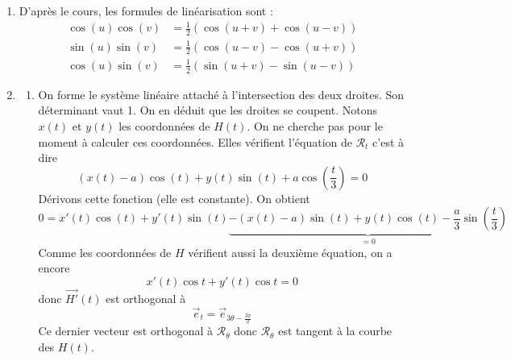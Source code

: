 \begin{enumerate}
\item D'après le cours, les formules de linéarisation sont :
\begin{align*}
 \cos(u) \cos(v) &=\frac{1}{2}\left( \cos(u+v) + \cos(u-v)\right) \\ 
 \sin(u) \sin(v) &=\frac{1}{2}\left( \cos(u-v) - \cos(u+v)\right) \\
 \cos(u) \sin(v) &=\frac{1}{2}\left( \sin(u+v) - \sin(u-v)\right)
\end{align*}


\item \begin{enumerate}
  \item On forme le système linéaire attaché à l'intersection des deux droites. Son déterminant vaut 1. On en déduit que les droites se coupent.\newline
  Notons $x(t)$ et $y(t)$ les coordonnées de $H(t)$. On ne cherche pas pour le moment à calculer ces coordonnées.\newline
  Elles vérifient l'équation de $\mathcal{R}_t$ c'est à dire
  \[(x(t)-a)\cos(t)  + y(t)\sin(t) +a\cos(\frac{t}{3})=0\]
  Dérivons cette fonction (elle est constante). On obtient
\begin{displaymath}
0=x'(t)\cos(t) + y'(t)\sin(t) 
\underset{=0}{\underbrace{- (x(t)-a)\sin(t)  + y(t)\cos(t) -\frac{a}{3}\sin(\frac{t}{3})}} 
\end{displaymath}
Comme les coordonnées de $H$ vérifient aussi la deuxième équation, on a encore 
\begin{displaymath}
x'(t)\cos t+y'(t)\cos t=0 
\end{displaymath}
donc $\overrightarrow{H'}(t)$ est orthogonal à 
\begin{displaymath}
\overrightarrow{e}_t=\overrightarrow{e}_{3\theta -\frac{3\pi}{2}} 
\end{displaymath}
Ce dernier vecteur est orthogonal à $\mathcal{R}_\theta$ donc $\mathcal{R}_\theta$ est tangent à la courbe des $H(t)$.
\begin{figure}
   \centering

\end{figure}
\end{enumerate}
\end{enumerate}
